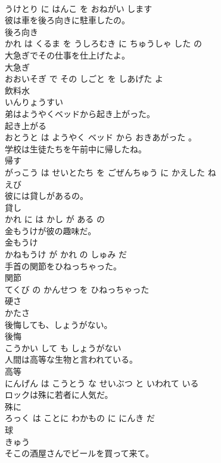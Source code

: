 \documentclass[8pt]{extreport}
\begin{document}
\begin{CJK}{UTF8}{min}
\\	うけとり に はんこ を おねがい します			
\\	彼は車を後ろ向きに駐車したの。	
\\	後ろ向き 
\\	かれ は くるま を うしろむき に ちゅうしゃ した の			
\\	大急ぎでその仕事を仕上げたよ。	
\\	大急ぎ 
\\	おおいそぎ で その しごと を しあげた よ			
\\	飲料水	
\\	いんりょうすい		
\\	弟はようやくベッドから起き上がった。	
\\	起き上がる 
\\	おとうと は ようやく ベッド から おきあがった 。			
\\	学校は生徒たちを午前中に帰したね。	
\\	帰す 
\\	がっこう は せいとたち を ごぜんちゅう に かえした ね			
\\	えび	
\\	彼には貸しがあるの。	
\\	貸し 
\\	かれ に は かし が ある の			
\\	金もうけが彼の趣味だ。	
\\	金もうけ 
\\	かねもうけ が かれ の しゅみ だ			
\\	手首の関節をひねっちゃった。	
\\	関節 
\\	てくび の かんせつ を ひねっちゃった			
\\	硬さ	
\\	かたさ		
\\	後悔しても、しょうがない。	
\\	後悔 
\\	こうかい して も しょうがない			
\\	人間は高等な生物と言われている。	
\\	高等 
\\	にんげん は こうとう な せいぶつ と いわれて いる			
\\	ロックは殊に若者に人気だ。	
\\	殊に 
\\	ろっく は ことに わかもの に にんき だ			
\\	球	
\\	きゅう		
\\	そこの酒屋さんでビールを買って来て。	

\end{CJK}
\end{document}
